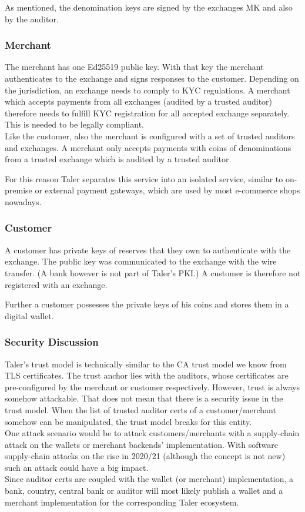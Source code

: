 As mentioned, the denomination keys are signed by the exchanges \ac{MK} and also by the auditor.

\subsubsection{Merchant}
The merchant has one Ed25519 public key.
With that key the merchant authenticates to the exchange and signs responses to the customer.
Depending on the jurisdiction, an exchange needs to comply to \ac{KYC} regulations.
A merchant which accepts payments from all exchanges (audited by a trusted auditor) therefore needs to fulfill \ac{KYC} registration for all accepted exchange separately.
This is needed to be legally compliant. \\
Like the customer, also the merchant is configured with a set of trusted auditors and exchanges.
A merchant only accepts payments with coins of denominations from a trusted exchange which is audited by a trusted auditor.

For this reason Taler separates this service into an isolated service, similar to on-premise or external payment gateways, which are used by most e-commerce shops nowadays.

\subsubsection{Customer}
A customer has private keys of reserves that they own to authenticate with the exchange.
The public key was communicated to the exchange with the wire transfer. (A bank however is not part of Taler's \ac{PKI}.)
A customer is therefore not registered with an exchange.

Further a customer possesses the private keys of his coins and stores them in a digital wallet.
\subsubsection{Security Discussion}
Taler's trust model is technically similar to the \ac{CA} trust model we know from TLS certificates.
The trust anchor lies with the auditors, whose certificates are pre-configured by the merchant or customer respectively.
However, trust is always somehow attackable.
That does not mean that there is a security issue in the trust model.
When the list of trusted auditor certs of a customer/merchant somehow can be manipulated, the trust model breaks for this entity. \\
One attack scenario would be to attack customers/merchants with a supply-chain attack on the wallets or merchant backends' implementation.
With software supply-chain attacks on the rise in 2020/21 (although the concept is not new) such an attack could have a big impact. \\
Since auditor certs are coupled with the wallet (or merchant) implementation, a bank, country, central bank or auditor will most likely publish a wallet and a merchant implementation for the corresponding Taler ecosystem.
